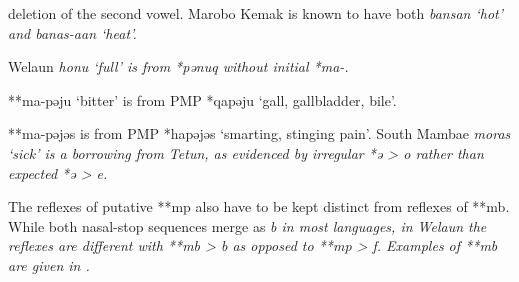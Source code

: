 \begin{table}[p]
\begin{threeparttable}
\begin{tablenotes}
{								deletion of the second vowel.
								Marobo Kemak is known to have both \it{bansan} ‘hot’ and \it{banas-aan} ‘heat’.}
			\item[Δ]	{Welaun \it{honu} ‘full’ is from *pənuq without initial *ma-.}
			\item[{ǁ}]	{**ma-pəju ‘bitter’ is from PMP *qapəju ‘gall, gallbladder, bile’.}
			\item[¶]	{**ma-pəjəs is from PMP *hapəjəs ‘smarting, stinging pain’.
								South Mambae \it{moras} ‘sick’ is a borrowing from Tetun,
								as evidenced by irregular *ə > \it{o} rather than expected *ə > \it{e}.}
		\end{tablenotes}
	\end{threeparttable}
\end{table}

The reflexes of putative **mp also have to be kept distinct from reflexes of **mb.
While both nasal-stop sequences merge as \it{b} in most  languages, in Welaun the reflexes are different with **mb > \it{b} as opposed
to **mp > \it{f.} Examples of **mb are given in .

